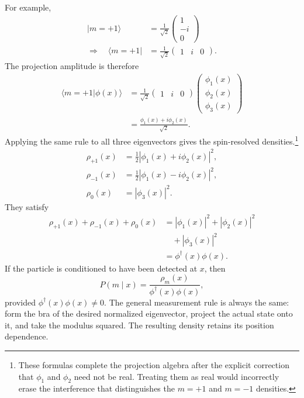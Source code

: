 For example,
\begin{equation}
\begin{aligned}
|m=+1\rangle
&=
\frac{1}{\sqrt2}
\begin{pmatrix}
1\\
-i\\
0
\end{pmatrix}
\\
\Longrightarrow\quad\langle m=+1|
&=
\frac{1}{\sqrt2}
\begin{pmatrix}
1&i&0
\end{pmatrix}.
\end{aligned}
\end{equation}
The projection amplitude is therefore
\begin{align}
\langle m=+1|\phi(x)\rangle
&=
\frac{1}{\sqrt2}
\begin{pmatrix}
1&i&0
\end{pmatrix}
\begin{pmatrix}
\phi_1(x)\\
\phi_2(x)\\
\phi_3(x)
\end{pmatrix}\\
&=
\frac{\phi_1(x)+i\phi_2(x)}{\sqrt2}.
\end{align}
Applying the same rule to all three eigenvectors gives the spin-resolved densities.\footnote{These formulas complete the projection algebra after the explicit correction that \(\phi_1\) and \(\phi_2\) need not be real. Treating them as real would incorrectly erase the interference that distinguishes the \(m=+1\) and \(m=-1\) densities.}
\begin{align}
\rho_{+1}(x)
&=
\frac12\left|\phi_1(x)+i\phi_2(x)\right|^2,\\
\rho_{-1}(x)
&=
\frac12\left|\phi_1(x)-i\phi_2(x)\right|^2,\\
\rho_0(x)
&=
|\phi_3(x)|^2.
\end{align}
They satisfy
\begin{equation}
\begin{aligned}
\rho_{+1}(x)+\rho_{-1}(x)+\rho_0(x)
&=
|\phi_1(x)|^2+|\phi_2(x)|^2
\\
&\quad{}+|\phi_3(x)|^2
\\
&=
\phi^\dagger(x)\phi(x).
\end{aligned}
\end{equation}
If the particle is conditioned to have been detected at \(x\), then
\begin{equation}
P(m\mid x)
=
\frac{\rho_m(x)}{\phi^\dagger(x)\phi(x)},
\end{equation}
provided \(\phi^\dagger(x)\phi(x)\neq0\). The general measurement rule is always the same: form the bra of the desired normalized eigenvector, project the actual state onto it, and take the modulus squared. The resulting density retains its position dependence.


